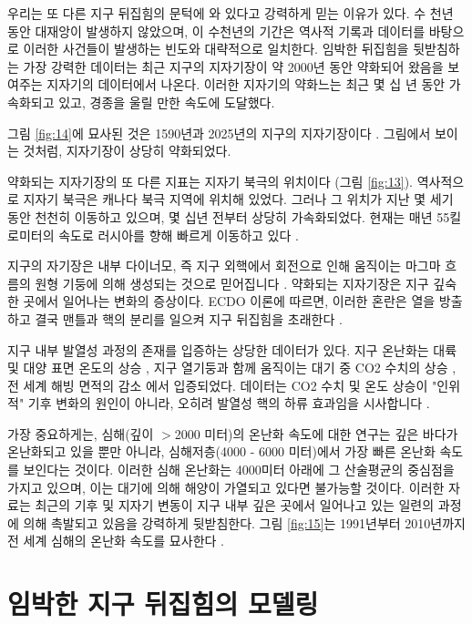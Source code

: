 \documentclass[10pt,twocolumn,letterpaper]{article}
\begin{document}
우리는 또 다른 지구 뒤집힘의 문턱에 와 있다고 강력하게 믿는 이유가 있다. 수 천년 동안 대재앙이 발생하지 않았으며, 이 수천년의 기간은 역사적 기록과 데이터를 바탕으로 이러한 사건들이 발생하는 빈도와 대략적으로 일치한다. 임박한 뒤집힘을 뒷받침하는 가장 강력한 데이터는 최근 지구의 지자기장이 약 2000년 동안 약화되어 왔음을 보여주는 지자기의 데이터에서 나온다. 이러한 지자기의 약화느는 최근 몇 십 년 동안 가속화되고 있고, 경종을 울릴 만한 속도에 도달했다.

그림 \ref{fig:14}에 묘사된 것은 1590년과 2025년의 지구의 지자기장이다 \cite{125,126}. 그림에서 보이는 것처럼, 지자기장이 상당히 약화되었다.

약화되는 지자기장의 또 다른 지표는 지자기 북극의 위치이다 (그림 \ref{fig:13}). 역사적으로 지자기 북극은 캐나다 북극 지역에 위치해 있었다. 그러나 그 위치가 지난 몇 세기 동안 천천히 이동하고 있으며, 몇 십년 전부터 상당히 가속화되었다. 현재는 매년 55킬로미터의 속도로 러시아를 향해 빠르게 이동하고 있다 \cite{124}.



지구의 자기장은 내부 다이너모, 즉 지구 외핵에서 회전으로 인해 움직이는 마그마 흐름의 원형 기둥에 의해 생성되는 것으로 믿어집니다 \cite{123}. 약화되는 지자기장은 지구 깊숙한 곳에서 일어나는 변화의 증상이다. ECDO 이론에 따르면, 이러한 혼란은 열을 방출하고 결국 맨틀과 핵의 분리를 일으켜 지구 뒤집힘을 초래한다 \cite{1}.

지구 내부 발열성 과정의 존재를 입증하는 상당한 데이터가 있다. 지구 온난화는 대륙 및 대양 표면 온도의 상승 \cite{127,128}, 지구 열기둥과 함께  움직이는 대기 중 CO2 수치의 상승 \cite{129,130}, 전 세계 해빙 면적의 감소 \cite{131}에서 입증되었다. 데이터는 CO2 수치 및 온도 상승이 "인위적" 기후 변화의 원인이 아니라, 오히려 발열성 핵의 하류 효과임을 시사합니다 \cite{129}.

가장 중요하게는, 심해(깊이 $>$2000 미터)의 온난화 속도에 대한 연구는 깊은 바다가 온난화되고 있을 뿐만 아니라, 심해저층(4000 - 6000 미터)에서 가장 빠른 온난화 속도를 보인다는 것이다. 이러한 심해 온난화는 4000미터 아래에 그 산술평균의 중심점을 가지고 있으며\cite{132,129}, 이는 대기에 의해  해양이 가열되고 있다면 불가능할 것이다. 이러한 자료는 최근의  기후 및 지자기 변동이 지구 내부 깊은 곳에서 일어나고 있는 일련의 과정에 의해 촉발되고 있음을 강력하게 뒷받침한다. 그림 \ref{fig:15}는 1991년부터 2010년까지 전 세계 심해의 온난화 속도를 묘사한다 \cite{132}.

\section{임박한 지구 뒤집힘의 모델링}
\end{document}
